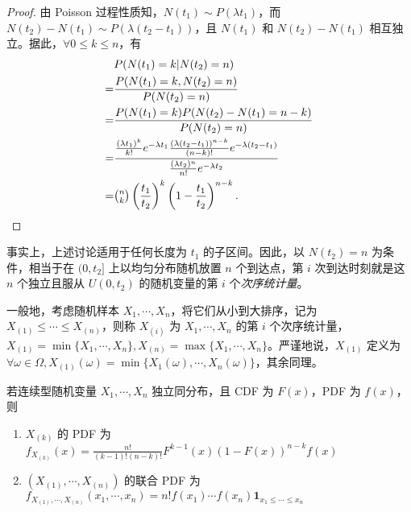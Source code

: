 \documentclass[../main.tex]{subfiles}
\begin{document}
\begin{proof}
    由 Poisson 过程性质知，$N(t_1)\sim P(\lambda t_1)$，而 $N(t_2)-N(t_1)\sim P(\lambda(t_2-t_1))$，且 $N(t_1)$ 和 $N(t_2)-N(t_1)$ 相互独立。据此，$\forall0\leq k\leq n$，有
    \begin{equation*}
        \begin{aligned}
              & P(N(t_1)=k|N(t_2)=n)                                                                                                                                      \\
            = & \frac{P(N(t_1)=k,N(t_2)=n)}{P(N(t_2)=n)}                                                                                                                  \\
            = & \frac{P(N(t_1)=k)P(N(t_2)-N(t_1)=n-k)}{P(N(t_2)=n)}                                                                                                       \\
            = & \frac{\frac{(\lambda t_1)^k}{k!}e^{-\lambda t_1}\frac{(\lambda(t_2-t_1))^{n-k}}{(n-k)!}e^{-\lambda(t_2-t_1)}}{\frac{(\lambda t_2)^n}{n!}e^{-\lambda t_2}} \\
            = & \tbinom nk\left(\frac{t_1}{t_2}\right)^k\left(1-\frac{t_1}{t_2}\right)^{n-k}.                                                                             \\
        \end{aligned}
    \end{equation*}
\end{proof}

事实上，上述讨论适用于任何长度为 $t_1$ 的子区间。因此，以 $N(t_2)=n$ 为条件，相当于在 $(0,t_2]$ 上以均匀分布随机放置 $n$ 个到达点，第 $i$ 次到达时刻就是这 $n$ 个独立且服从 $U(0,t_2)$ 的随机变量的第 $i$ 个\emph{次序统计量}。

一般地，考虑随机样本 $X_1,\cdots,X_n$，将它们从小到大排序，记为 $X_{(1)}\leq\cdots\leq X_{(n)}$，则称 $X_{(i)}$ 为 $X_1,\cdots,X_n$ 的第 $i$ 个次序统计量，$X_{(1)}=\min\{X_1,\cdots,X_n\},X_{(n)}=\max\{X_1,\cdots,X_n\}$。严谨地说，$X_{(1)}$ 定义为 $\forall\omega\in\Omega,X_{(1)}(\omega)=\min\{X_1(\omega),\cdots,X_n(\omega)\}$，其余同理。

\begin{proposition}
    若连续型随机变量 $X_1,\cdots,X_n$ 独立同分布，且 CDF 为 $F(x)$，PDF 为 $f(x)$，则
    \begin{enumerate}
        \item $X_{(k)}$ 的 PDF 为 $f_{X_{(k)}}(x)=\frac{n!}{(k-1)!(n-k)!}F^{k-1}(x)(1-F(x))^{n-k}f(x)$
        \item $(X_{(1)},\cdots,X_{(n)})$ 的联合 PDF 为 $f_{X_{(1)},\cdots,X_{(n)}}(x_1,\cdots,x_n)=n!f(x_1)\cdots f(x_n)\mathbf 1_{x_1\leq\cdots\leq x_n}$
    \end{enumerate}
\end{proposition}
\end{document}
